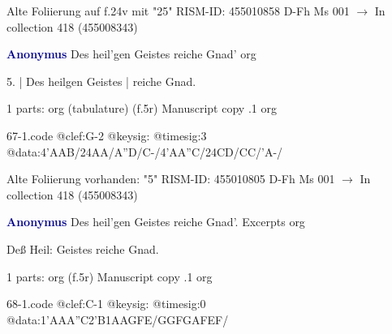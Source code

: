 \documentclass[twocolumn]{book}
\begin{document}
\newline Alte Foliierung auf f.24v mit "25"
\newline RISM-ID: 455010858
\newline D-Fh  Ms 001
\newline $\rightarrow$ In collection 418 (455008343)
      
\newline \par \vspace{7pt} \textcolor{darkblue}{\textbf{Anonymus  }}
\newline Des heil'gen Geistes reiche Gnad'
\newline org
\newline \begin{itshape}[f.5r, at left:] 5. | Des heilgen Geistes | reiche Gnad.\end{itshape} 
\newline \textcolor{darkblue}{}  1 parts: org (tabulature)  (f.5r)
\newline Manuscript copy
.1  org  
\begin{filecontents*}{67-1.code}
@clef:G-2
@keysig:
@timesig:3
@data:4'AAB/24AA/A''D/C-/4'AA''C/24CD/CC/'A-/
\end{filecontents*}
\newline
%

\newline Alte Foliierung vorhanden: "5"
\newline RISM-ID: 455010805
\newline D-Fh  Ms 001
\newline $\rightarrow$ In collection 418 (455008343)
      
\newline \par \vspace{7pt} \textcolor{darkblue}{\textbf{Anonymus  }}
\newline Des heil'gen Geistes reiche Gnad'. Excerpts
\newline org
\newline \begin{itshape} Deß Heil: Geistes reiche Gnad.\end{itshape} 
\newline \textcolor{darkblue}{}  1 parts: org  (f.5r)
\newline Manuscript copy
.1  org  
\begin{filecontents*}{68-1.code}
@clef:C-1
@keysig:
@timesig:0
@data:1'AAA''C2'B1AAGFE/GGFGAFEF/
\end{filecontents*}
\newline
%
\end{document}
